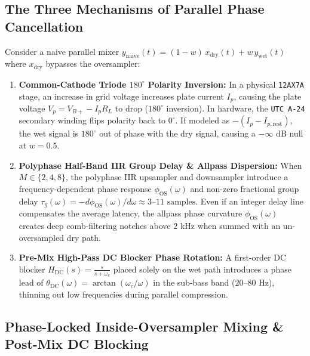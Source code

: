 \documentclass[11pt,a4paper]{article}
\begin{document}
\subsection{The Three Mechanisms of Parallel Phase Cancellation}

Consider a naive parallel mixer $y_{\text{naive}}(t) = (1 - w)\,x_{\text{dry}}(t) + w\,y_{\text{wet}}(t)$ where $x_{\text{dry}}$ bypasses the oversampler:
\begin{enumerate}
    \item \textbf{Common-Cathode Triode $180^\circ$ Polarity Inversion:} In a physical \texttt{12AX7A} stage, an increase in grid voltage increases plate current $I_p$, causing the plate voltage $V_p = V_{B+} - I_p R_L$ to drop ($180^\circ$ inversion). In hardware, the \texttt{UTC A-24} secondary winding flips polarity back to $0^\circ$. If modeled as $-(I_p - I_{p,\text{rest}})$, the wet signal is $180^\circ$ out of phase with the dry signal, causing a $-\infty\text{ dB}$ null at $w = 0.5$.
    \item \textbf{Polyphase Half-Band IIR Group Delay \& Allpass Dispersion:} When $M \in \{2, 4, 8\}$, the polyphase IIR upsampler and downsampler introduce a frequency-dependent phase response $\phi_{\text{OS}}(\omega)$ and non-zero fractional group delay $\tau_g(\omega) = -d\phi_{\text{OS}}(\omega)/d\omega \approx 3\text{--}11\text{ samples}$. Even if an integer delay line compensates the average latency, the allpass phase curvature $\phi_{\text{OS}}(\omega)$ creates deep comb-filtering notches above $2\text{ kHz}$ when summed with an un-oversampled dry path.
    \item \textbf{Pre-Mix High-Pass DC Blocker Phase Rotation:} A first-order DC blocker $H_{\text{DC}}(s) = \frac{s}{s + \omega_c}$ placed solely on the wet path introduces a phase lead of $\theta_{\text{DC}}(\omega) = \arctan(\omega_c / \omega)$ in the sub-bass band ($20\text{--}80\text{ Hz}$), thinning out low frequencies during parallel compression.
\end{enumerate}

\subsection{Phase-Locked Inside-Oversampler Mixing \& Post-Mix DC Blocking}
\end{document}
